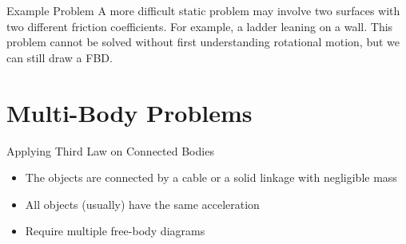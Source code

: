 \documentclass[12pt,compress,aspectratio=169]{beamer}
\begin{document}
\begin{frame}{Example Problem}
  A more difficult static problem may involve two surfaces with two different
  friction coefficients. For example, a ladder leaning on a wall. This problem
  cannot be solved without first understanding rotational motion, but we can
  still draw a FBD.
  \vspace{.2in}
\end{frame}



\section{Multi-Body Problems}

\begin{frame}{Applying Third Law on Connected Bodies}
  \begin{center}
  \end{center}
  \begin{itemize}
  \item The objects are connected by a cable or a solid linkage with negligible
    mass
  \item All objects (usually) have the same acceleration
  \item Require multiple free-body diagrams
  \end{itemize}
\end{frame}
\end{document}
